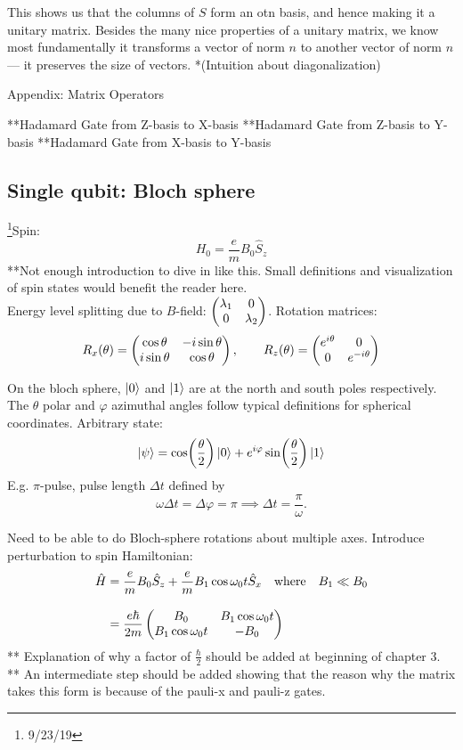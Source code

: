\documentclass[12pt]{article}
\begin{document}
This shows us that the columns of $S$ form an otn basis, and hence making it a unitary matrix. Besides the many nice properties of a unitary matrix, we know most fundamentally it transforms a vector of norm $n$ to another vector of norm $n$ --- it preserves the size of vectors. 
*(Intuition about diagonalization)

Appendix: Matrix Operators 

**Hadamard Gate from Z-basis to X-basis
**Hadamard Gate from Z-basis to Y-basis
**Hadamard Gate from X-basis to Y-basis



\subsection{Single qubit: Bloch sphere}
\footnote{9/23/19}Spin:
\begin{equation}
    H_0 = \frac{e}{m}B_0\hat{S}_z
    \label{eq:spin-hamiltonian}
\end{equation}
**Not enough introduction to dive in like this. Small definitions and visualization of spin states would benefit the reader here.\\
Energy level splitting due to $B$-field:
$\pmqty{\dmat[0]{\lambda_1,\lambda_2}}$.
Rotation matrices:
\[R_x(\theta) = \pmqty{\cos\theta&-i\sin\theta\\ i\sin\theta&\cos\theta},
\qquad
R_z(\theta) = \pmqty{\dmat[0]{e^{i\theta},e^{-i\theta}}}\]

On the bloch sphere, $\ket{0}$ and $\ket{1}$ are at the north and south poles respectively. The $\theta$ polar and $\varphi$ azimuthal angles follow typical definitions for spherical coordinates. Arbitrary state:
\[\ket{\psi} = \cos(\frac{\theta}{2})\ket{0}
+ e^{i\varphi}\sin(\frac{\theta}{2})\ket{1}\]
E.g. $\pi$-pulse, pulse length $\Delta t$ defined by
\[\omega\Delta t = \Delta \varphi = \pi
\implies \Delta t = \frac{\pi}{\omega}.\]

Need to be able to do Bloch-sphere rotations about multiple axes.
Introduce perturbation to spin Hamiltonian:
\begin{alignat}{1}
    \hat{H} &= \frac{e}{m}B_0\hat{S}_z + \frac{e}{m}B_1\cos\omega_0t\hat{S}_x
    \qq{where} B_1 \ll B_0
    \\[2ex]
    &= \frac{e\hbar}{2m}
    \pmqty{B_0&B_1\cos\omega_0t\\B_1\cos\omega_0t&-B_0}
\end{alignat}
** Explanation of why a factor of $\frac{\hbar}{2}$ should be added at beginning of chapter 3.\\
** An intermediate step should be added showing that the reason why the matrix takes this form is because of the pauli-x and pauli-z gates.
\end{document}
